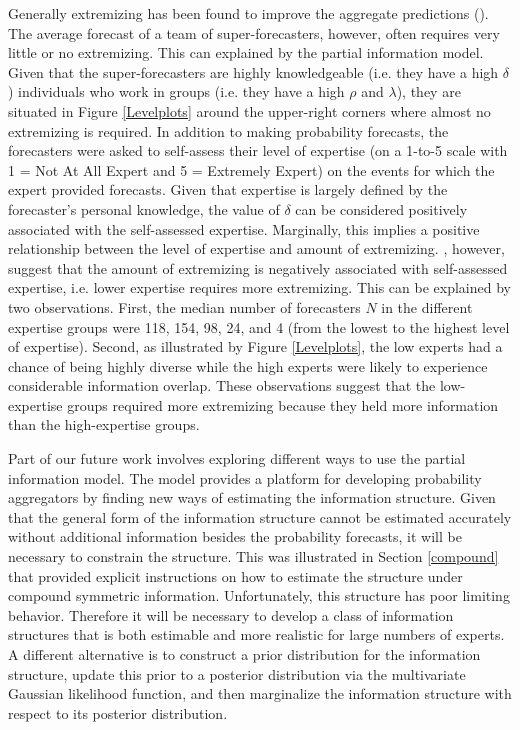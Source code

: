 \documentclass[11pt]{article}
\theoremstyle{definition}
\theoremstyle{definition}
\begin{document}
Generally extremizing has been found to improve the aggregate predictions (\cite{mellers}). The average forecast of a team of super-forecasters, however, often requires very little or no extremizing. This can explained by the partial information model. Given that the  super-forecasters are highly knowledgeable (i.e. they have a high $\delta$) individuals who work in groups (i.e. they have a high $\rho$ and $\lambda$), they are situated in Figure \ref{Levelplots} around the upper-right corners where almost no extremizing is required. In addition to making probability forecasts, the forecasters were asked to self-assess their level of expertise (on a 1-to-5 scale with 1 = Not At All Expert and 5 = Extremely Expert) on the events for which the expert provided forecasts. Given that expertise is largely defined by the forecaster's personal knowledge, the value of $\delta$ can be considered positively associated with the self-assessed expertise. Marginally, this implies a positive relationship between the level of expertise and amount of extremizing. \cite{satopaa}, however, suggest that the amount of extremizing is negatively associated with self-assessed expertise, i.e. lower expertise requires more extremizing. This can be explained by two observations. First, the median number of forecasters $N$ in the different expertise groups were 118, 154,  98,  24, and 4 (from the lowest to the highest level of expertise). Second, as illustrated by Figure \ref{Levelplots}, the low experts had a chance of being highly diverse while the high experts were likely to experience considerable information overlap. These observations suggest that the low-expertise groups required more extremizing because they held more information than the high-expertise groups.


Part of our future work involves exploring different ways to use the partial information model. The model provides a platform for developing probability aggregators by finding new ways of estimating the information structure. Given that the general form of the information structure cannot be estimated accurately without additional information besides the probability forecasts, it will be necessary to constrain the structure. This was illustrated in Section \ref{compound} that provided explicit instructions on how to estimate the structure under compound symmetric information. Unfortunately, this structure has poor limiting behavior. Therefore it will be necessary to develop a class of information structures that is  both estimable and more realistic for large numbers of experts.  A different alternative is to construct a prior distribution for the information structure, update this prior to a posterior distribution via the multivariate Gaussian likelihood function, and then marginalize the information structure with respect to its posterior distribution.  
\end{document}
